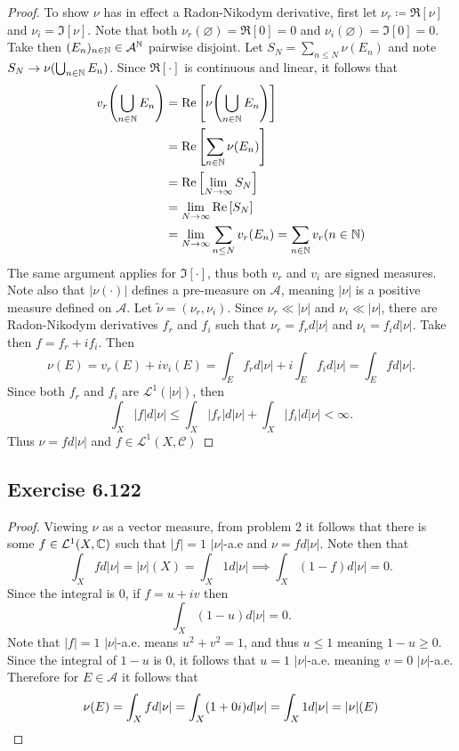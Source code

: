 \documentclass[hw_all.tex]{subfiles}
\begin{document}
\begin{proof}
    To show $\nu$ has in effect a Radon-Nikodym derivative, first let $\nu_r \coloneq \Re[\nu]$ and $\nu_i = \Im[\nu]$. Note that both $\nu_r(\varnothing) = \Re[0] = 0$ and $\nu_i(\varnothing) = \Im[0] = 0$. Take then $(E_n)_{n\in \mathbb{N}} \in \mathcal{A}^{\mathbb{N}}$ pairwise disjoint. Let $S_N = \sum_{n \leq N} \nu(E_n)$ and note $S_N \to \nu(\bigcup_{n \in \mathbb{N}} E_n)$. Since $\Re[\cdot]$ is continuous and linear, it follows that
    \begin{align*}
        v_r\qty(\bigcup_{n \in \mathbb{N}} E_n) &= \Re\qty[\nu\qty(\bigcup_{n \in \mathbb{N}} E_n)] \\
        &= \Re\qty[\sum_{n \in \mathbb{N}} \nu(E_n)] \\
        &= \Re\qty[\lim_{N \to \infty} S_N] \\
        &= \lim_{N \to \infty} \Re\qty[S_N] \\
        &= \lim_{N \to \infty} \sum_{n \leq N} v_r(E_n) = \sum_{n \in \mathbb{N}} v_r(n \in \mathbb{N})
    \end{align*}
    The same argument applies for $\Im[\cdot]$, thus both $v_r$ and $v_i$ are signed measures. Note also that $|\nu(\cdot)|$ defines a pre-measure on $\mathcal{A}$, meaning $|\nu|$ is a positive measure defined on $\mathcal{A}$. Let $\tilde{\nu} = (\nu_r, \nu_i)$. Since $\nu_r \ll |\nu|$ and $\nu_i \ll |\nu|$, there are Radon-Nikodym derivatives $f_r$ and $f_i$ such that $\nu_r = f_r d|\nu|$ and $\nu_i = f_i d|\nu|$. Take then $f = f_r + i f_i$. Then
    \[
        \nu(E) = v_r(E) + i v_i(E) = \int_{E} f_r d|\nu| + i \int_E f_i d|\nu| = \int_E f d|\nu|
    .\]
    Since both $f_r$ and $f_i$ are $\mathcal{L}^1(|\nu|)$, then
    \[
        \int_X |f| d|\nu| \leq \int_X |f_r| d|\nu| + \int_X |f_i| d|\nu| < \infty
    .\]
    Thus $\nu = f d|\nu|$ and $f \in \mathcal{L}^1(X, \mathcal{C})$
\end{proof}

\subsection{Exercise 6.122}

\begin{proof}
    Viewing $\nu$ as a vector measure, from problem 2 it follows that there is some $f \in \mathcal{L}^1(X, \mathbb{C})$ such that $|f| = 1$ $|\nu|$-a.e and $\nu = f d|\nu|$. Note then that
    \[
        \int_X f d|\nu| = |\nu|(X) = \int_X 1 d |\nu| \implies \int_X (1 - f) d|\nu| = 0
    .\]
    Since the integral is $0$, if $f = u + iv$ then
    \[
        \int_X (1 - u) d|\nu| = 0
    .\]
    Note that $|f| = 1$ $|\nu|$-a.e. means $u^2 + v^2 = 1$, and thus $u \leq 1$ meaning $1 - u \geq 0$. Since the integral of $1 - u$ is $0$, it follows that $u = 1$ $|\nu|$-a.e. meaning $v = 0$ $|\nu|$-a.e. Therefore for $E \in \mathcal{A}$ it follows that
    \[
        \nu(E) = \int_X f d|\nu| = \int_X (1 + 0i) d|\nu| = \int_X 1 d|\nu| = |\nu|(E) \qedhere
    \]
\end{proof}
\end{document}
